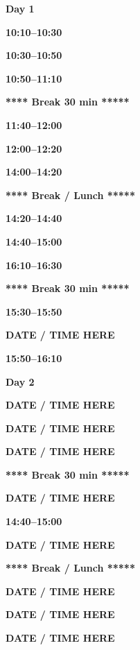 \documentclass[12pt]{extbook}
\newcommand{\dayheader}[1]{
\clearpage
\begin{center}
\Large\bfseries Day #1
\end{center}
\bigskip}
\newcommand{\breaktime}[1]{
\bigskip
\begin{center}
\Large\bfseries ***** Break #1 *****
\end{center}
\bigskip}
\newcommand{\abstract}[2]{{
\bigskip
\begin{center}
\bfseries #1
\end{center}}
\par
}
\begin{document}



\dayheader{1}


\abstract{10:10--10:30}{abstracts/Kipfer} %
\abstract{10:30--10:50}{abstracts/Daskalopoulou} %
\abstract{10:50--11:10}{abstracts/Kimani} %


\breaktime{30 min}

\abstract{11:40--12:00}{abstracts/Mtili} %
\abstract{12:00--12:20}{abstracts/Giroud} %
\abstract{14:00--14:20}{abstracts/Roques} %

\breaktime{ / Lunch}

\abstract{14:20--14:40}{abstracts/Lightfoot} %
\abstract{14:40--15:00}{abstracts/Dutoit} %
\abstract{16:10--16:30}{abstracts/Finger} %

\breaktime{30 min}

\abstract{15:30--15:50}{abstracts/Strauch_Zimmer} %
\abstract{DATE / TIME HERE}{abstracts/vanRooyen} %
\abstract{15:50--16:10}{abstracts/Ortega} %




\dayheader{2}











\abstract{DATE / TIME HERE}{abstracts/Engelhardt} %
\abstract{DATE / TIME HERE}{abstracts/Picard} %
\abstract{DATE / TIME HERE}{abstracts/Hillegonds} %

\breaktime{30 min}

\abstract{DATE / TIME HERE}{abstracts/Jacops} %
\abstract{14:40--15:00}{abstracts/Tomonaga} %
\abstract{DATE / TIME HERE}{abstracts/Kim} %

\breaktime{ / Lunch}

\abstract{DATE / TIME HERE}{abstracts/vanLeeuw} %
\abstract{DATE / TIME HERE}{abstracts/Currle} %
\abstract{DATE / TIME HERE}{abstracts/Wang} %
\end{document}

